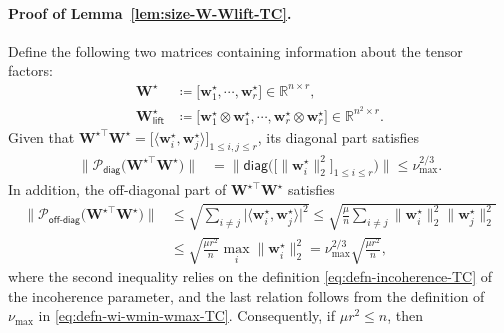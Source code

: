 \paragraph{Proof of Lemma~\ref{lem:size-W-Wlift-TC}.}

Define the following two matrices containing information about the tensor factors:
%
\begin{subequations}
\begin{align}
\bm{W}^{\star} & \coloneqq\big[\bm{w}_{1}^{\star},\cdots,\bm{w}_{r}^{\star}\big]\in\mathbb{R}^{n\times r},   \label{eq:defn-Wstar_TC}\\
\bm{W}_{\mathsf{lift}}^{\star} & \coloneqq\big[\bm{w}_{1}^{\star}\otimes\bm{w}_{1}^{\star},\cdots,\bm{w}_{r}^{\star}\otimes\bm{w}_{r}^{\star}\big]\in\mathbb{R}^{n^{2}\times r}.
	\label{eq:defn-Wstar-lift-TC}
\end{align}
\end{subequations}
%
Given that $\bm{W}^{\star\top}\bm{W}^{\star}=\big[\big\langle\bm{w}_{i}^{\star},\bm{w}_{j}^{\star}\big\rangle\big]_{1\leq i,j\leq r}$, its diagonal part satisfies
%
\begin{align*}
	\Big\| \mathcal{P}_{\mathsf{diag}}\big(\bm{W}^{\star\top}\bm{W}^{\star}\big) \Big\|
	& = \Big\| \mathsf{diag}\Big(\big[\big\|\bm{w}_{i}^{\star}\big\|_{2}^{2}\big]_{1\leq i\leq r}\Big) \Big\|
	\leq \nu_{\max}^{2/3}.
\end{align*}
%
In addition, the off-diagonal part of $\bm{W}^{\star\top} \bm{W}^{\star}$ satisfies
%
\begin{align*}
\Big\|\mathcal{P}_{\mathsf{off}\text{-}\mathsf{diag}}\big( \bm{W}^{\star\top} \bm{W}^{\star}\big)\Big\|
	& \leq\sqrt{\sum_{i\neq j}\big|\big\langle\bm{w}_{i}^{\star},\bm{w}_{j}^{\star}\big\rangle\big|^{2}}\leq\sqrt{\frac{\mu}{n}\sum_{i\neq j}\big\|\bm{w}_{i}^{\star}\big\|_{2}^{2}\big\|\bm{w}_{j}^{\star}\big\|_{2}^{2}}\\
	& \leq \sqrt{\frac{\mu r^{2}}{n}} \max_i \big\|\bm{w}_i^{\star} \big\|_2^2 =  \nu_{\max}^{2/3} \sqrt{\frac{\mu r^{2}}{n}},
\end{align*}
%
where the second inequality   
 relies on the definition \eqref{eq:defn-incoherence-TC} of the incoherence parameter, and the last relation follows from the definition of $\nu_{\max}$ in \eqref{eq:defn-wi-wmin-wmax-TC}. 
 Consequently, if $\mu r^{2}\leq n$, then

